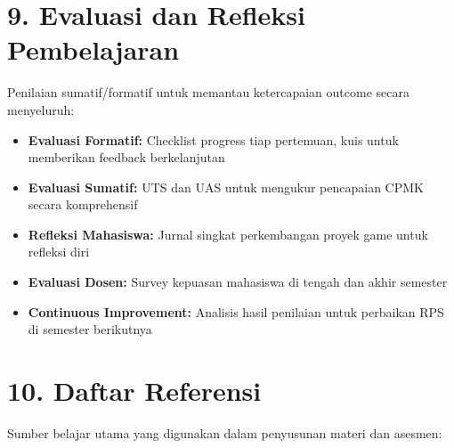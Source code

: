 \documentclass[12pt,a4paper]{article}
\begin{document}
\vspace{0.5cm}

\section*{9. Evaluasi dan Refleksi Pembelajaran}

Penilaian sumatif/formatif untuk memantau ketercapaian outcome secara menyeluruh:

\begin{itemize}[leftmargin=*]
  \item \textbf{Evaluasi Formatif:} Checklist progress tiap pertemuan, kuis untuk memberikan feedback berkelanjutan
  \item \textbf{Evaluasi Sumatif:} UTS dan UAS untuk mengukur pencapaian CPMK secara komprehensif
  \item \textbf{Refleksi Mahasiswa:} Jurnal singkat perkembangan proyek game untuk refleksi diri
  \item \textbf{Evaluasi Dosen:} Survey kepuasan mahasiswa di tengah dan akhir semester
  \item \textbf{Continuous Improvement:} Analisis hasil penilaian untuk perbaikan RPS di semester berikutnya
\end{itemize}

\vspace{0.5cm}

\section*{10. Daftar Referensi}

Sumber belajar utama yang digunakan dalam penyusunan materi dan asesmen:
\end{document}
